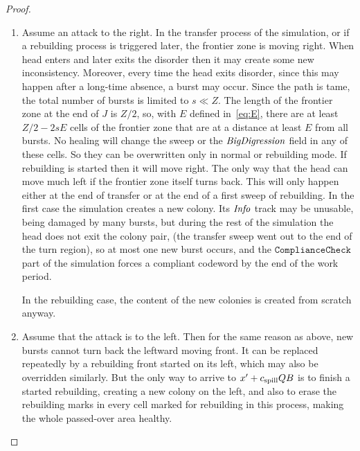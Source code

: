 \documentclass[11pt]{memoir}
\theoremstyle{definition} %
\newcommand{\fld}[1]{\ensuremath{\textit{#1\/}}}
\newcommand{\rul}[1]{\ensuremath{\texttt{#1}}}
\def\B{B}
\newcommand{\E}{E} %
\newcommand{\Q}{Q} %
\newcommand{\s}{s} %
\newcommand{\Z}{Z} %
\newcommand{\BigDigression}{\fld{BigDigression}}
\newcommand{\Info}{\fld{Info}}
\newcommand{\cns}[1]{c_{\textrm{\upshape #1}}}
\newcommand{\CSpill}{\cns{spill}}
\begin{document}
\begin{proof}
\begin{enumerate}
\item Assume an attack to the right.
  In the transfer process of the simulation, or if a rebuilding process is triggered later,
  the frontier zone is moving right.
  When head enters and later exits the disorder then it may create some new inconsistency.
  Moreover, every time the head exits disorder, since this may happen after a long-time
  absence, a burst may occur.
  Since the path is tame, the total number of bursts is limited to \(  \s \ll \Z \).
The length of the frontier zone at the end of \( J \) is \( \Z/2 \), so, with \( \E \) defined
in~\eqref{eq:E}, there are at least
  \( \Z/2-2\s\E \) cells of the frontier zone that are at a distance at least \( \E \) from
  all bursts.
  No healing will change the sweep or the \( \BigDigression \) field in any of these cells.
  So they can be overwritten only in normal or rebuilding mode.
  If rebuilding is started then it will move right.
The only way that the head can move much left if the frontier zone itself turns back.
This will only happen either at the end of transfer or at the end of a first sweep of rebuilding.
In the first case the simulation creates a new colony.
Its \( \Info \) track may be unusable, being damaged by many bursts, but 
during the rest of the simulation the head does not exit the colony pair,
(the transfer sweep went out to the end of the turn region), so at most one
new burst occurs, and the \( \rul{ComplianceCheck} \) part of the simulation forces
a compliant codeword by the end of the work period.

In the rebuilding case, the content of the new colonies is created from scratch anyway. 

\item Assume that the attack is to the left.
  Then for the same reason as above, new bursts cannot turn back
  the leftward moving front.
  It can be replaced repeatedly by a rebuilding front started on its left,
  which may also be overridden similarly.
  But the only way to arrive to \( x' + \CSpill\Q\B \) is to finish a started rebuilding,
  creating a new colony on the left, and also to erase the rebuilding marks
  in every cell marked for rebuilding in this process, making the whole passed-over area 
  healthy.


\end{enumerate}
\end{proof}
\end{document}
